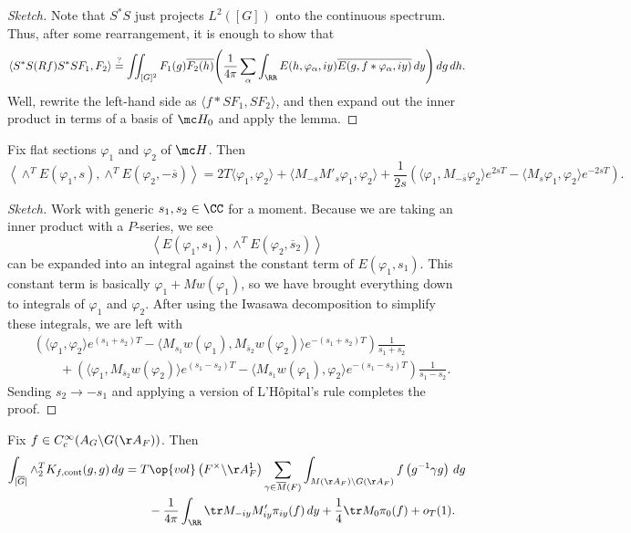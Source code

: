 \documentclass{article}
\begin{document}
\begin{proof}[Sketch]
	Note that $S^*S$ just projects $L^2([G])$ onto the continuous spectrum. Thus, after some rearrangement, it is enough to show that
	\[\langle S^*S(Rf)S^*SF_1,F_2\rangle\stackrel?=\iint_{[G]^2}F_1(g)\overline{F_2(h)}\Bigg(\frac1{4\pi}\sum_\alpha\int_\RR E(h,\varphi_\alpha,iy)\overline{E(g,f*\varphi_\alpha,iy)}\,dy\Bigg)\,dg\,dh.\]
	Well, rewrite the left-hand side as $\langle f*SF_1,SF_2\rangle$, and then expand out the inner product in terms of a basis of $\mc H_0$ and apply the lemma.
\end{proof}
\begin{lemma}
	Fix flat sections $\varphi_1$ and $\varphi_2$ of $\mc H$. Then
	\[\left\langle\land^TE(\varphi_1,s),\land^TE(\varphi_2,-\overline s)\right\rangle=2T\langle\varphi_1,\varphi_2\rangle+\langle M_{-s}M'_s\varphi_1,\varphi_2\rangle+\frac1{2s}\left(\langle\varphi_1,M_{-\overline s}\varphi_2\rangle e^{2sT}-\langle M_s\varphi_1,\varphi_2\rangle e^{-2sT}\right).\]
\end{lemma}
\begin{proof}[Sketch]
	Work with generic $s_1,s_2\in\CC$ for a moment. Because we are taking an inner product with a $P$-series, we see
	\[\left\langle E(\varphi_1,s_1),\land^TE(\varphi_2,\overline s_2)\right\rangle\]
	can be expanded into an integral against the constant term of $E(\varphi_1,s_1)$. This constant term is basically $\varphi_1+Mw(\varphi_1)$, so we have brought everything down to integrals of $\varphi_1$ and $\varphi_2$. After using the Iwasawa decomposition to simplify these integrals, we are left with
	\begin{align*}
		&\left(\langle\varphi_1,\varphi_2\rangle e^{(s_1+s_2)T}-\langle M_{s_1}w(\varphi_1),M_{\overline s_2}w(\varphi_2)\rangle e^{-(s_1+s_2)T}\right)\frac1{s_1+s_2} \\
		&\qquad+\left(\langle\varphi_1,M_{\overline s_2}w(\varphi_2)\rangle e^{(s_1-s_2)T}-\langle M_{s_1}w(\varphi_1),\varphi_2\rangle e^{-(s_1-s_2)T}\right)\frac1{s_1-s_2}.
	\end{align*}
	Sending $s_2\to-s_1$ and applying a version of L'H\^opital's rule completes the proof.
\end{proof}
\begin{proposition}
	Fix $f\in C_c^\infty(A_G\backslash G(\AA_F))$. Then
	\begin{align*}
		\int_{[\overline G]}\land_2^TK_{f,\mathrm{cont}}(g,g)\,dg &= T\op{vol}\left(F^\times\backslash\AA_F^1\right)\sum_{\gamma\in\overline M(F)}\int_{M(\AA_F)\backslash G(\AA_F)}f\left(g^{-1}\gamma g\right)\,dg\\
		&\qquad-\frac1{4\pi}\int_\RR\tr M_{-iy}M'_{iy}\pi_{iy}(f)\,dy+\frac14\tr M_0\pi_0(f)+o_T(1).
	\end{align*}
\end{proposition}
\end{document}
